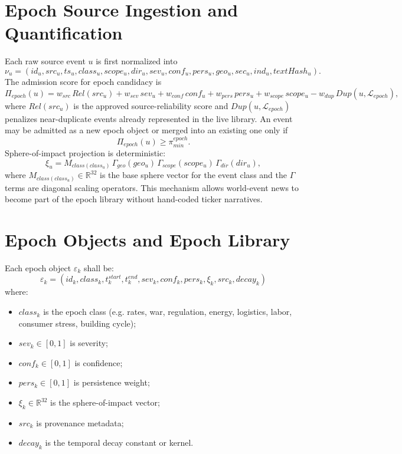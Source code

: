 \section{Epoch Source Ingestion and Quantification}

Each raw source event $u$ is first normalized into
\[
\nu_u=(id_u,src_u,ts_u,class_u,scope_u,dir_u,sev_u,conf_u,pers_u,geo_u,sec_u,ind_u,textHash_u).
\]
The admission score for epoch candidacy is
\[
\Pi_{epoch}(u)=w_{src}\,Rel(src_u)+w_{sev}\,sev_u+w_{conf}\,conf_u+w_{pers}\,pers_u+w_{scope}\,scope_u-w_{dup}\,Dup(u,\mathcal{L}_{epoch}),
\]
where $Rel(src_u)$ is the approved source-reliability score and $Dup(u,\mathcal{L}_{epoch})$ penalizes near-duplicate events already represented in the live library. An event may be admitted as a new epoch object or merged into an existing one only if
\[
\Pi_{epoch}(u)\ge \pi_{min}^{epoch}.
\]
Sphere-of-impact projection is deterministic:
\[
\xi_u = M_{class(class_u)}\,\Gamma_{geo}(geo_u)\,\Gamma_{scope}(scope_u)\,\Gamma_{dir}(dir_u),
\]
where $M_{class(class_u)}\in\mathbb{R}^{32}$ is the base sphere vector for the event class and the $\Gamma$ terms are diagonal scaling operators. This mechanism allows world-event news to become part of the epoch library without hand-coded ticker narratives.

\section{Epoch Objects and Epoch Library}

Each epoch object $\varepsilon_k$ shall be:
\[
\varepsilon_k = (id_k,class_k,t_k^{start},t_k^{end},sev_k,conf_k,pers_k,\xi_k,src_k,decay_k)
\]
where:
\begin{itemize}
\item $class_k$ is the epoch class (e.g. rates, war, regulation, energy, logistics, labor, consumer stress, building cycle);
\item $sev_k\in[0,1]$ is severity;
\item $conf_k\in[0,1]$ is confidence;
\item $pers_k\in[0,1]$ is persistence weight;
\item $\xi_k\in\mathbb{R}^{32}$ is the sphere-of-impact vector;
\item $src_k$ is provenance metadata;
\item $decay_k$ is the temporal decay constant or kernel.
\end{itemize}

